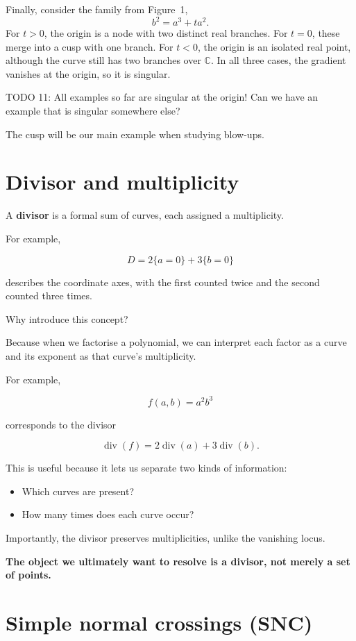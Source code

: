 \documentclass[12pt]{article}
\begin{document}
Finally, consider the family from Figure~1,
\[
b^2=a^3+ta^2.
\]
For $t>0$, the origin is a node with two distinct real branches.
For $t=0$, these merge into a cusp with one branch.
For $t<0$, the origin is an isolated real point, although
the curve still has two branches over $\mathbb C$.
In all three cases, the gradient vanishes at the origin,
so it is singular.

TODO 11: All examples so far are singular at the origin! Can we have an example that is singular somewhere else?

The cusp will be our main example when studying blow-ups.

\newpage
\section{Divisor and multiplicity}\label{divisor-and-multiplicity}

A \textbf{divisor} is a formal sum of curves, each assigned a
multiplicity.

For example,

\[
D=2\{a=0\}+3\{b=0\}
\]

describes the coordinate axes, with the first counted twice and the
second counted three times.

Why introduce this concept?

Because when we factorise a polynomial, we can interpret each factor as
a curve and its exponent as that curve's multiplicity.

For example,

\[
f(a,b)=a^2b^3
\]

corresponds to the divisor

\[
\operatorname{div}(f)
=2\operatorname{div}(a)+3\operatorname{div}(b).
\]

This is useful because it lets us separate two kinds of information:

\begin{itemize}
\item
  Which curves are present?
\item
  How many times does each curve occur?
\end{itemize}

Importantly, the divisor preserves multiplicities, unlike the vanishing
locus.

\textbf{The object we ultimately want to resolve is a divisor, not
merely a set of points.}

\newpage
\section{Simple normal crossings
(SNC)}\label{simple-normal-crossings-snc}
\end{document}
